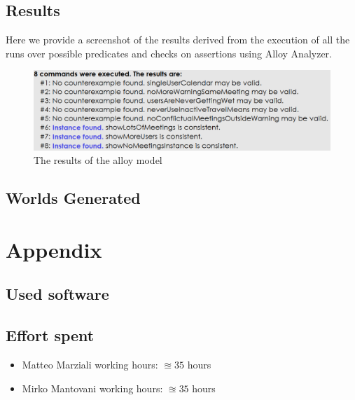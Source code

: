 \documentclass{article}
\begin{document}
\texttt{}	

\clearpage
\subsection{Results}
\begin{center}
Here we provide a screenshot of the results derived from the execution of all the runs over possible predicates and checks on assertions using Alloy Analyzer.
	\begin{figure}[htp] 

\includegraphics[width=\textwidth]{alloy/material/alloyresults} 
\caption{The results of the alloy model} 
\label{fig:alloyresults} 
\end{figure} 
\end{center}
\clearpage
\subsection{Worlds Generated}

\clearpage
\section{Appendix}

\subsection{Used software}


\subsection{Effort spent}
\begin{itemize}

\item Matteo Marziali working hours:  $\approxeq35$ hours

\item Mirko Mantovani working hours:  $\approxeq35$ hours



\end{itemize}
\end{document}
